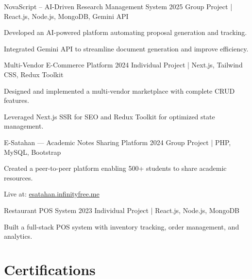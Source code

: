 \documentclass[letterpaper,11.8pt]{article}
\begin{document}
\vspace{10pt}

{NovaScript – AI-Driven Research Management System}
{2025}
{Group Project | React.js, Node.js, MongoDB, Gemini API}{
  \item Developed an AI-powered platform automating proposal generation and tracking.
  \item Integrated Gemini API to streamline document generation and improve efficiency.
}

\vspace{10pt}

{Multi-Vendor E-Commerce Platform}
{2024}
{Individual Project | Next.js, Tailwind CSS, Redux Toolkit}{
  \item Designed and implemented a multi-vendor marketplace with complete CRUD features.
  \item Leveraged Next.js SSR for SEO and Redux Toolkit for optimized state management.
}

\vspace{6pt}
\newpage

{E-Satahan — Academic Notes Sharing Platform}
{2024}
{Group Project | PHP, MySQL, Bootstrap}{
  \item Created a peer-to-peer platform enabling 500+ students to share academic resources.
  \item Live at: \href{https://esatahan.infinityfree.me}{esatahan.infinityfree.me}
}

\vspace{6pt}

{Restaurant POS System}
{2023}
{Individual Project | React.js, Node.js, MongoDB}{
  \item Built a full-stack POS system with inventory tracking, order management, and analytics.
}

\section{Certifications}
\vspace{-1pt}
\end{document}
